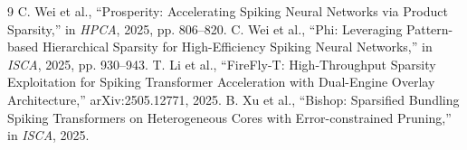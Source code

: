 \documentclass[9pt,twocolumn]{article}
\begin{document}
\begin{thebibliography}{9}\footnotesize
{} C. Wei et al., ``Prosperity: Accelerating Spiking Neural
  Networks via Product Sparsity,'' in \emph{HPCA}, 2025, pp. 806--820.
 C. Wei et al., ``Phi: Leveraging Pattern-based Hierarchical
  Sparsity for High-Efficiency Spiking Neural Networks,'' in \emph{ISCA}, 2025,
  pp. 930--943.
 T. Li et al., ``FireFly-T: High-Throughput Sparsity
  Exploitation for Spiking Transformer Acceleration with Dual-Engine Overlay
  Architecture,'' arXiv:2505.12771, 2025.
 B. Xu et al., ``Bishop: Sparsified Bundling Spiking
  Transformers on Heterogeneous Cores with Error-constrained Pruning,'' in
  \emph{ISCA}, 2025.
\end{thebibliography}
\end{document}

